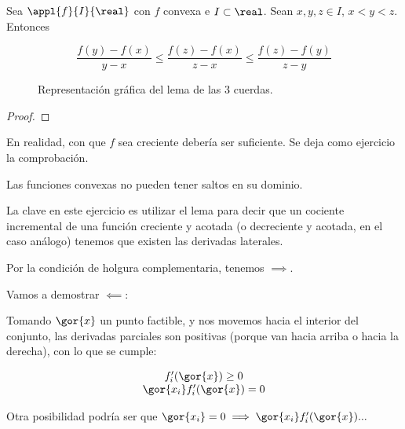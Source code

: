 \begin{problem}[4]


\solution

\begin{lemma}
Sea $\appl{f}{I}{\real}$ con $f$ convexa e $I\subset \real$. Sean $x,y,z \in I$, $x<y<z$. Entonces

\[
\frac{f(y)-f(x)}{y-x} \leq \frac{f(z)-f(x)}{z-x} \leq \frac{f(z)-f(y)}{z-y}
\]
\end{lemma}


\begin{figure}[hbtp]
\centering
{}
\caption{Representación gráfica del lema de las 3 cuerdas.}
\end{figure}

\begin{proof}

\end{proof}

\obs En realidad, con que $f$ sea creciente debería ser suficiente. Se deja como ejercicio la comprobación.

\ppart Las funciones convexas no pueden tener saltos en su dominio.

La clave en este ejercicio es utilizar el lema para decir que un cociente incremental de una función creciente y acotada (o decreciente y acotada, en el caso análogo) tenemos que existen las derivadas laterales.

\end{problem}

\begin{problem}[8]


\solution

Por la condición de holgura complementaria, tenemos $\implies$.

Vamos a demostrar $\impliedby$:


Tomando $\gor{x}$ un punto factible, y nos movemos hacia el interior del conjunto, las derivadas parciales son positivas (porque van hacia arriba o hacia la derecha), con lo que se cumple:

\[
    \begin{array}{c}
        f'_i(\gor{x}) \geq 0\\
        \gor{x_i}f'_i(\gor{x}) = 0
    \end{array}
\]

Otra posibilidad podría ser que $\gor{x_i} = 0 \implies \gor{x_i}f_i'(\gor{x}) ...$
\end{problem}


